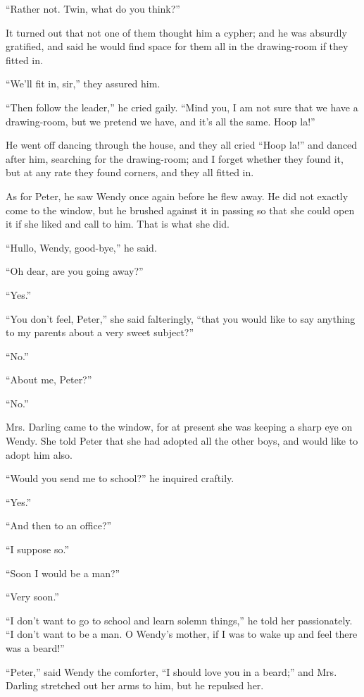 ``Rather not. Twin, what do you think?''

It turned out that not one of them thought him a cypher; and he was
absurdly gratified, and said he would find space for them all in the
drawing-room if they fitted in.

``We'll fit in, sir,'' they assured him.

``Then follow the leader,'' he cried gaily. ``Mind you, I am not sure that
we have a drawing-room, but we pretend we have, and it's all the same.
Hoop la!''

He went off dancing through the house, and they all cried ``Hoop la!''
and danced after him, searching for the drawing-room; and I forget
whether they found it, but at any rate they found corners, and they all
fitted in.

As for Peter, he saw Wendy once again before he flew away. He did not
exactly come to the window, but he brushed against it in passing so
that she could open it if she liked and call to him. That is what she
did.

``Hullo, Wendy, good-bye,'' he said.

``Oh dear, are you going away?''

``Yes.''

``You don't feel, Peter,'' she said falteringly, ``that you would like to
say anything to my parents about a very sweet subject?''

``No.''

``About me, Peter?''

``No.''

Mrs. Darling came to the window, for at present she was keeping a sharp
eye on Wendy. She told Peter that she had adopted all the other boys,
and would like to adopt him also.

``Would you send me to school?'' he inquired craftily.

``Yes.''

``And then to an office?''

``I suppose so.''

``Soon I would be a man?''

``Very soon.''

``I don't want to go to school and learn solemn things,'' he told her
passionately. ``I don't want to be a man. O Wendy's mother, if I was to
wake up and feel there was a beard!''

``Peter,'' said Wendy the comforter, ``I should love you in a beard;'' and
Mrs. Darling stretched out her arms to him, but he repulsed her.

